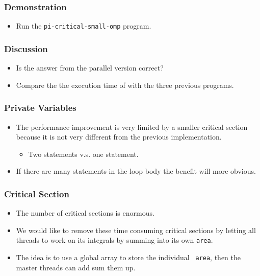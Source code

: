 \documentclass{beamer}
\begin{document}
\begin{frame}
\end{frame}

\begin{frame}
  \frametitle{Demonstration}
  \begin{itemize}
  \item Run the {\tt pi-critical-small-omp} program.
  \end{itemize}
\end{frame}

\begin{frame}
  \frametitle{Discussion}
  \begin{itemize}
  \item Is the answer from the parallel version correct? 
  \item Compare the the execution time of with the three previous
    programs.
  \end{itemize}
\end{frame}

\begin{frame}
  \frametitle{Private Variables} 
  \begin{itemize}
  \item The performance improvement is very limited by a smaller
    critical section because it is not very different from the
    previous implementation.
    \begin{itemize}
      \item Two statements v.s. one statement.
    \end{itemize}
    \item If there are many statements in the loop body the benefit
      will more obvious.
  \end{itemize}
\end{frame}

\begin{frame}
  \frametitle{Critical Section}
  \begin{itemize}
  \item The number of critical sections is enormous.
  \item We would like to remove these time consuming critical sections
    by letting all threads to work on its integrals by summing into
    its own {\tt area}.
  \item The idea is to use a global array to store the individual {\tt
    area}, then the master threads can add sum them up.
  \end{itemize}
\end{frame}
\end{document}
